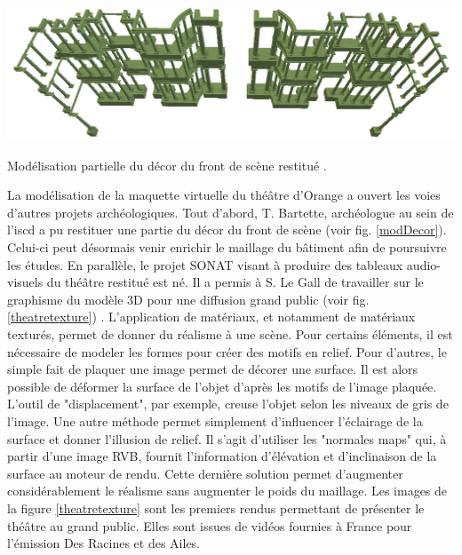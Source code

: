 
 \begin{figureth}
		\includegraphics[width=\linewidth]{images/modDecor}
	\caption[Modélisation partielle du décor du front de scène restitué.]{Modélisation partielle du décor du front de scène restitué \footnotemark.} 
	\label{modDecor}
\end{figureth}
La modélisation de la maquette virtuelle du théâtre d'Orange a ouvert les voies d'autres projets archéologiques. Tout d'abord, T. Bartette, archéologue au sein de l'\gls{iscd} a pu restituer une partie du décor du front de scène (voir fig. \ref{modDecor}). Celui-ci peut désormais venir enrichir le maillage du bâtiment afin de poursuivre les études. En parallèle, le projet SONAT visant à produire des tableaux audio-visuels du théâtre restitué est né. Il a permis à S. Le Gall de travailler sur le graphisme du modèle 3D pour une diffusion grand public (voir fig. \ref{theatretexture}) \cite[S. LeGall]{titien}. L'application de matériaux, et notamment de matériaux texturés, permet de donner du réalisme à une scène. Pour certains éléments, il est nécessaire de modeler les formes pour créer des motifs en relief. Pour d'autres, le simple fait de plaquer une image permet de décorer une surface. Il est alors possible de déformer la surface de l'objet d'après les motifs de l'image plaquée. L'outil de "displacement", par exemple, creuse l'objet selon les niveaux de gris de l'image. Une autre méthode permet simplement d'influencer l'éclairage de la surface et donner l'illusion de relief. Il s'agit d'utiliser les "normales maps" qui, à partir d'une image \gls{RVB}, fournit l'information d'élévation et d'inclinaison de la surface au moteur de rendu. Cette dernière solution permet d'augmenter considérablement le réalisme sans augmenter le poids du maillage. Les images de la figure \ref{theatretexture} sont les premiers rendus permettant de présenter le théâtre au grand public. Elles sont issues de vidéos fournies à France pour l'émission Des Racines et des Ailes.

